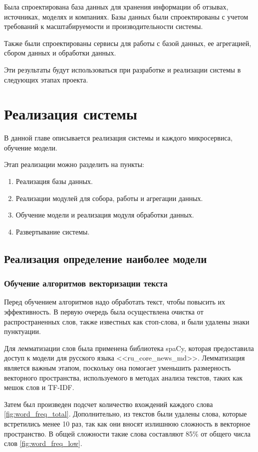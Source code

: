 \documentclass[PI, VKR]{HSEUniversity}
\begin{document}
Была спроектирована база данных для хранения информации об отзывах, источниках, моделях и компаниях. Базы данных были спроектированы с учетом требований к масштабируемости и производительности системы.

Также были спроектированы сервисы для работы с базой данных, ее агрегацией, сбором данных и обработки данных.

Эти результаты будут использоваться при разработке и реализации системы в следующих этапах проекта.
\chapter{Реализация системы}
\label{sec:org38e98be}
В данной главе описывается реализация системы и каждого микросервиса, обучение модели.

Этап реализации можно разделить на пункты:
\begin{enumerate}
\item Реализация базы данных.
\item Реализации модулей для собора, работы и агрегации данных.
\item Обучение модели и реализация модуля обработки данных.
\item Развертывание системы.
\end{enumerate}
\section{Реализация определение наиболее модели}
\label{sec:orge36a05c}
\subsection{Обучение алгоритмов векторизации текста}
\label{sec:org9df0e93}
Перед обучением алгоритмов надо обработать текст, чтобы повысить их эффективность. В первую очередь была осуществлена очистка от распространенных слов, также известных как стоп-слова, и были удалены знаки пунктуации.

Для лемматизации слов была применена библиотека spaCy\autocite{boyd_explosion_2023}, которая предоставила доступ к модели для русского языка {}<<ru\_core\_news\_md>>{}. Лемматизация является важным этапом, поскольку она помогает уменьшить размерность векторного пространства, используемого в методах анализа текстов, таких как мешок слов и TF-IDF.

Затем был произведен подсчет количество вхождений каждого слова \ref{fig:word_freq_total}. Дополнительно, из текстов были удалены слова, которые встретились менее 10 раз, так как они вносят излишнюю сложность в векторное пространство. В общей сложности такие слова составляют 85\% от общего числа слов \ref{fig:word_freq_low}.
\end{document}
